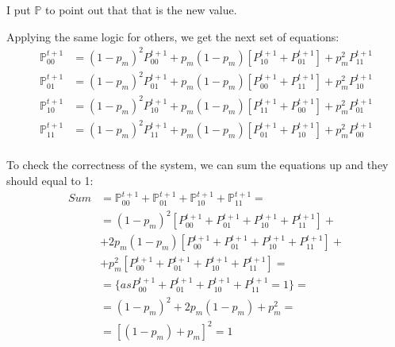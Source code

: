\documentclass[12pt, a4paper]{article}
\begin{document}
        I put $\mathbb{P}$ to point out that that is the new value.

        Applying the same logic for others, we get the next set of equations:
        \begin{align*}
            \mathbb{P}_{00}^{t+1} &= (1 - p_m)^2 P_{00}^{t+1} + p_m(1 - p_m)[P_{10}^{t+1} + P_{01}^{t+1}] + p_m^2 P_{11}^{t+1} \\
            \mathbb{P}_{01}^{t+1} &= (1 - p_m)^2 P_{01}^{t+1} + p_m(1 - p_m)[P_{00}^{t+1} + P_{11}^{t+1}] + p_m^2 P_{10}^{t+1} \\
            \mathbb{P}_{10}^{t+1} &= (1 - p_m)^2 P_{10}^{t+1} + p_m(1 - p_m)[P_{11}^{t+1} + P_{00}^{t+1}] + p_m^2 P_{01}^{t+1} \\
            \mathbb{P}_{11}^{t+1} &= (1 - p_m)^2 P_{11}^{t+1} + p_m(1 - p_m)[P_{01}^{t+1} + P_{10}^{t+1}] + p_m^2 P_{00}^{t+1} \\
        \end{align*}

        To check the correctness of the system, we can sum the equations up and they should equal to 1:
        \begin{align*}
            Sum &= \mathbb{P}_{00}^{t+1} + \mathbb{P}_{01}^{t+1} + \mathbb{P}_{10}^{t+1} + \mathbb{P}_{11}^{t+1} = \\
            & = (1 - p_m)^2 [P_{00}^{t+1} + P_{01}^{t+1} + P_{10}^{t+1} + P_{11}^{t+1}] +\\
            & + 2 p_m (1 - p_m)[P_{00}^{t+1} + P_{01}^{t+1} + P_{10}^{t+1} + P_{11}^{t+1}] +\\
            & + p_m^2 [P_{00}^{t+1} + P_{01}^{t+1} + P_{10}^{t+1} + P_{11}^{t+1}] =\\
            & = \{as P_{00}^{t+1} + P_{01}^{t+1} + P_{10}^{t+1} + P_{11}^{t+1} = 1\} =\\
            & = (1 - p_m)^2 + 2 p_m (1 - p_m) + p_m^2 =\\
            & = [(1 - p_m) + p_m]^2 = 1
        \end{align*}\textbf{}
\end{document}
